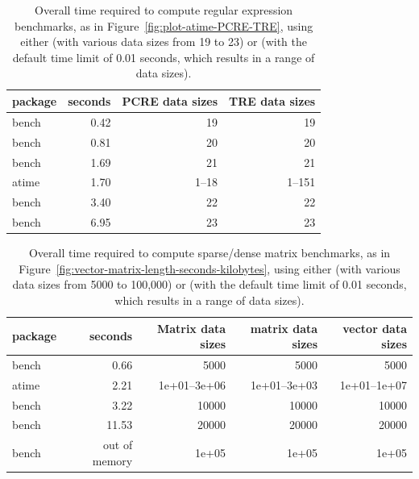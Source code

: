\begin{table}[t]
\centering
\begin{tabular}{lrrr}
  \hline
package & seconds & PCRE data sizes & TRE data sizes \\ 
  \hline
bench & 0.42 & 19 & 19 \\ 
  bench & 0.81 & 20 & 20 \\ 
  bench & 1.69 & 21 & 21 \\ 
  atime & 1.70 & 1--18 & 1--151 \\ 
  bench & 3.40 & 22 & 22 \\ 
  bench & 6.95 & 23 & 23 \\ 
   \hline
\end{tabular}
\caption{\label{tab:PCRE-TRE}Overall time required to compute regular expression benchmarks, as in Figure~\ref{fig:plot-atime-PCRE-TRE}, using either  (with various data sizes from 19 to 23) or  (with the default time limit of 0.01 seconds, which results in a range of data sizes).}
\end{table}

\begin{table}
\centering
\begin{tabular}{lrrrr}
  \hline
package & seconds & Matrix data sizes & matrix data sizes & vector data sizes \\ 
  \hline
bench & 0.66 & 5000 & 5000 & 5000 \\ 
  atime & 2.21 & 1e+01--3e+06 & 1e+01--3e+03 & 1e+01--1e+07 \\ 
  bench & 3.22 & 10000 & 10000 & 10000 \\ 
  bench & 11.53 & 20000 & 20000 & 20000 \\ 
  bench & out of memory & 1e+05 & 1e+05 & 1e+05 \\ 
   \hline
\end{tabular}
\caption{\label{tab:matrix-vector}Overall time required to compute sparse/dense matrix benchmarks, as in Figure~\ref{fig:vector-matrix-length-seconds-kilobytes}, using either  (with various data sizes from 5000 to 100,000) or  (with the default time limit of 0.01 seconds, which results in a range of data sizes).}
\end{table}


